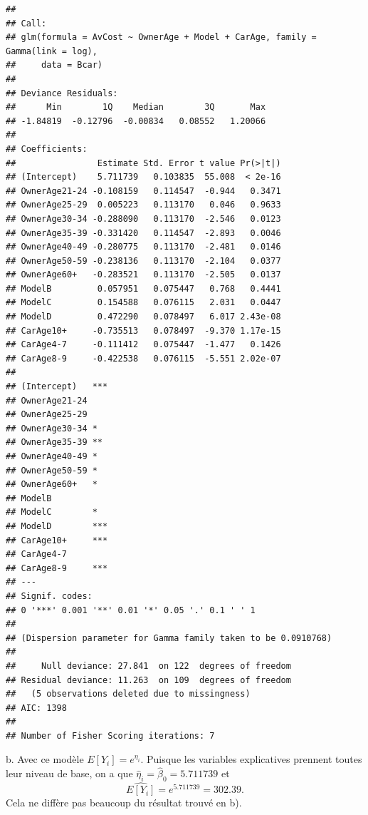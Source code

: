 \begin{solution}{2.8}
\begin{enumerate}
\begin{knitrout}
\color{fgcolor}\begin{kframe}
\begin{alltt}
 \hlkwb{<-} \hlopt{~}\hlopt{+}\hlopt{+}\hlstd{=}\hlstd{(}
\end{alltt}
\begin{verbatim}
##
## Call:
## glm(formula = AvCost ~ OwnerAge + Model + CarAge, family = Gamma(link = log),
##     data = Bcar)
##
## Deviance Residuals:
##      Min        1Q    Median        3Q       Max
## -1.84819  -0.12796  -0.00834   0.08552   1.20066
##
## Coefficients:
##                Estimate Std. Error t value Pr(>|t|)
## (Intercept)    5.711739   0.103835  55.008  < 2e-16
## OwnerAge21-24 -0.108159   0.114547  -0.944   0.3471
## OwnerAge25-29  0.005223   0.113170   0.046   0.9633
## OwnerAge30-34 -0.288090   0.113170  -2.546   0.0123
## OwnerAge35-39 -0.331420   0.114547  -2.893   0.0046
## OwnerAge40-49 -0.280775   0.113170  -2.481   0.0146
## OwnerAge50-59 -0.238136   0.113170  -2.104   0.0377
## OwnerAge60+   -0.283521   0.113170  -2.505   0.0137
## ModelB         0.057951   0.075447   0.768   0.4441
## ModelC         0.154588   0.076115   2.031   0.0447
## ModelD         0.472290   0.078497   6.017 2.43e-08
## CarAge10+     -0.735513   0.078497  -9.370 1.17e-15
## CarAge4-7     -0.111412   0.075447  -1.477   0.1426
## CarAge8-9     -0.422538   0.076115  -5.551 2.02e-07
##
## (Intercept)   ***
## OwnerAge21-24
## OwnerAge25-29
## OwnerAge30-34 *
## OwnerAge35-39 **
## OwnerAge40-49 *
## OwnerAge50-59 *
## OwnerAge60+   *
## ModelB
## ModelC        *
## ModelD        ***
## CarAge10+     ***
## CarAge4-7
## CarAge8-9     ***
## ---
## Signif. codes:
## 0 '***' 0.001 '**' 0.01 '*' 0.05 '.' 0.1 ' ' 1
##
## (Dispersion parameter for Gamma family taken to be 0.0910768)
##
##     Null deviance: 27.841  on 122  degrees of freedom
## Residual deviance: 11.263  on 109  degrees of freedom
##   (5 observations deleted due to missingness)
## AIC: 1398
##
## Number of Fisher Scoring iterations: 7
\end{verbatim}
\end{kframe}
\end{knitrout}

b. Avec ce modèle $E[Y_i]=e^{\eta_i}.$ Puisque les variables explicatives prennent toutes leur niveau de base, on a que $\hat{\eta}_i=\hat{\beta}_0=5.711739$ et $$\widehat{E[Y_i]}=e^5.711739=302.39.$$ Cela ne diffère pas beaucoup du résultat trouvé en b).


\end{enumerate}
\end{solution}
